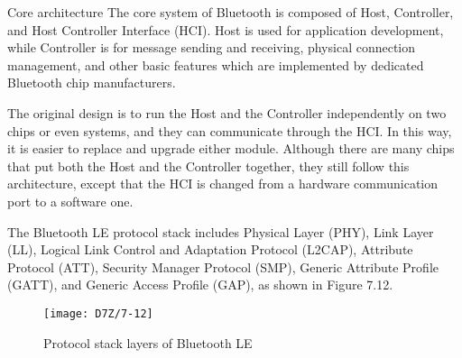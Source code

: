 \documentclass[a4paper,12pt]{book}
\begin{document}
\begin{term}{Core architecture}
    The core system of Bluetooth is composed of Host, Controller, and Host Controller Interface (HCI). Host is used for application development, while Controller is for message sending and receiving, physical connection management, and other basic features which are implemented by dedicated Bluetooth chip manufacturers.

    \parskip 6pt
    The original design is to run the Host and the Controller independently on two chips or even systems, and they can communicate through the HCI. In this way, it is easier to replace and upgrade either module. Although there are many chips that put both the Host and the Controller together, they still follow this architecture, except that the HCI is changed from a hardware communication port to a software one.
    
    The Bluetooth LE protocol stack includes Physical Layer (PHY), Link Layer (LL), Logical Link Control and Adaptation Protocol (L2CAP), Attribute Protocol (ATT), Security Manager Protocol (SMP), Generic Attribute Profile (GATT), and Generic Access Profile (GAP), as shown in Figure 7.12.

    \begin{figure}[!h]
        \centering
        \texttt{[image: D7Z/7-12]}
        \caption{Protocol stack layers of Bluetooth LE}
    \end{figure}


\end{term}
\end{document}
